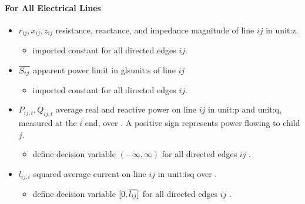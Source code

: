 \paragraph{For All Electrical Lines}
\begin{itemize}

\item $r_{ij}, x_{ij}, z_{ij}$ resistance, reactance, and impedance magnitude
  of line $ij$ in \gls{unit:z}.  \begin{itemize} \item \gls{imported} constant
  for all directed edges $ij$.  \end{itemize}

\item $\overline{S_{ij}}$ apparent power limit in gls{unit:s} of line $ij$
  \begin{itemize} \item \gls{imported} constant for all directed edges
  $ij$.  \end{itemize}

\item $P_{ij,t}, Q_{ij,t}$ average real and reactive power on line $ij$ in
\gls{unit:p} and \gls{unit:q}, measured at the $i$ end, over \intervaloft{}.
A positive sign represents power flowing to child
  $j$.  \begin{itemize} \item \gls{define} decision variable $(-\infty, \infty)$
  for all directed edges $ij$ \atallt{}.  \end{itemize}

\item $l_{ij,t}$ squared average current on line $ij$ in \gls{unit:isq} over
\intervaloft{}.
  \begin{itemize} \item \gls{define} decision variable $[0, \overline{l_{ij}}]$ for
  all directed edges $ij$ \atallt{}.  \end{itemize}

\end{itemize}
